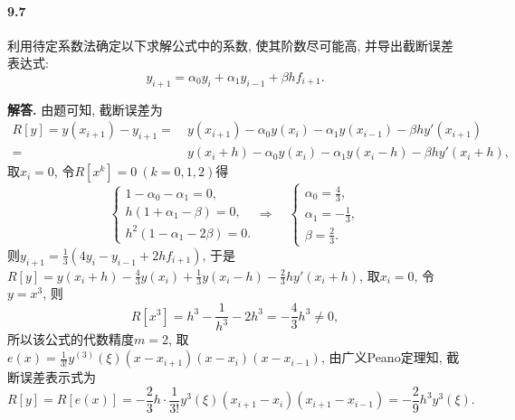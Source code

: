 \documentclass[12pt, a4paper, oneside]{ctexart}
\newenvironment{solution}{\par\noindent\textbf{解答. }}{\bigskip\par}
\def\del{\vspace{-3.5ex}}  %
\begin{document}
\paragraph{9.7}利用待定系数法确定以下求解公式中的系数, 使其阶数尽可能高, 并导出截断误差表达式:
\begin{equation*}
    y_{i+1} = \alpha_0 y_i+\alpha_1 y_{i-1}+\beta hf_{i+1}.
\end{equation*}
\begin{solution}
    由题可知, 截断误差为
    \begin{align*}
        R[y] = y(x_{i+1}) - y_{i+1} =&\ y(x_{i+1}) - \alpha_0 y(x_i)-\alpha_1y(x_{i-1}) - \beta hy'(x_{i+1})\\
        =&\ y(x_i+h)-\alpha_0y(x_i)-\alpha_1y(x_i-h)-\beta hy'(x_i+h),
    \end{align*}
    取$x_i=0$, 令$R[x^k] = 0\ (k=0,1,2)$得
    \begin{equation*}
        \begin{cases}
            1-\alpha_0-\alpha_1 = 0,\\
            h(1+\alpha_1-\beta) = 0,\\
            h^2(1-\alpha_1-2\beta) = 0.
        \end{cases}\Rightarrow\quad\begin{cases}
            \alpha_0 = \frac{4}{3},\\
            \alpha_1 = -\frac{1}{3},\\
            \beta = \frac{2}{3}.
        \end{cases}
    \end{equation*}
    则$y_{i+1} = \frac{1}{3}(4y_i-y_{i-1}+2hf_{i+1})$, 于是$R[y] = y(x_i+h) - \frac{4}{3}y(x_i)+\frac{1}{3}y(x_i-h)-\frac{2}{3}hy'(x_i+h)$, 取$x_i = 0$, 令$y = x^3$, 则
    \begin{equation*}
        R[x^3] = h^3-\frac{1}{h^3}-2h^3 = -\frac{4}{3}h^3\neq 0,
    \end{equation*}
    所以该公式的代数精度$m=2$, 取$e(x) = \frac{1}{3!}y^{(3)}(\xi)(x-x_{i+1})(x-x_i)(x-x_{i-1})$, 由广义Peano定理知, 截断误差表示式为
    \begin{equation*}
        R[y] = R[e(x)] = -\frac{2}{3}h\cdot \frac{1}{3!}y^3(\xi)(x_{i+1}-x_i)(x_{i+1}-x_{i-1}) = -\frac{2}{9}h^3y^3(\xi).
    \end{equation*}
\end{solution}\del\del
\end{document}
